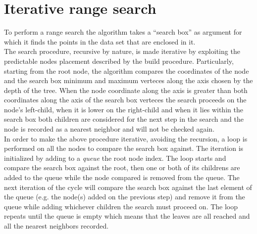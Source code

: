 \section{Iterative range search}
To perform a range search the algorithm takes a ``search box'' as argument for which it finds the points in the data set that are enclosed in it.\\
The search procedure, recursive by nature, is made iterative by exploiting the predictable nodes placement described by the build procedure.
Particularly, starting from the root node, the algorithm compares the coordinates of the node and the search box minimum and maximum verteces along the axis chosen by the depth of the tree.
When the node coordinate along the axis is greater than both coordinates along the axis of the search box verteces the search proceeds on the node's left-child, when it is lower on the right-child and when it lies within the search box both children are considered for the next step in the search and the node is recorded as a nearest neighbor and will not be checked again.\\
In order to make the above procedure iterative, avoiding the recursion, a loop is performed on all the nodes to compare the search box against. The iteration is initialized by adding to a \textit{queue} the root node index. The loop starts and compare the search box against the root, then one or both of its childrens are added to the queue while the node compared is removed from the queue. The next iteration of the cycle will compare the search box against the last element of the queue (e.g. the node(s) added on the previous step) and remove it from the queue while adding whichever children the search must proceed on. The loop repeats until the queue is empty which means that the leaves are all reached and all the nearest neighbors recorded.\\

